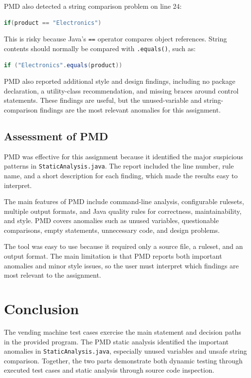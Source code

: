 \documentclass[12pt]{article}
\begin{document}
PMD also detected a string comparison problem on line 24:

\begin{lstlisting}[language=Java]
if(product == "Electronics")
\end{lstlisting}

This is risky because Java's \texttt{==} operator compares object references. String contents should normally be compared with \texttt{.equals()}, such as:

\begin{lstlisting}[language=Java]
if ("Electronics".equals(product))
\end{lstlisting}

PMD also reported additional style and design findings, including no package declaration, a utility-class recommendation, and missing braces around control statements. These findings are useful, but the unused-variable and string-comparison findings are the most relevant anomalies for this assignment.

\subsection{Assessment of PMD}

PMD was effective for this assignment because it identified the major suspicious patterns in \texttt{StaticAnalysis.java}. The report included the line number, rule name, and a short description for each finding, which made the results easy to interpret.

The main features of PMD include command-line analysis, configurable rulesets, multiple output formats, and Java quality rules for correctness, maintainability, and style. PMD covers anomalies such as unused variables, questionable comparisons, empty statements, unnecessary code, and design problems.

The tool was easy to use because it required only a source file, a ruleset, and an output format. The main limitation is that PMD reports both important anomalies and minor style issues, so the user must interpret which findings are most relevant to the assignment.

\section{Conclusion}

The vending machine test cases exercise the main statement and decision paths in the provided program. The PMD static analysis identified the important anomalies in \texttt{StaticAnalysis.java}, especially unused variables and unsafe string comparison. Together, the two parts demonstrate both dynamic testing through executed test cases and static analysis through source code inspection.
\end{document}
